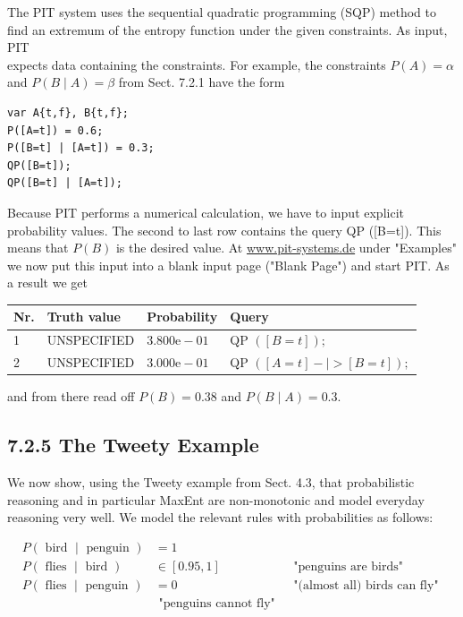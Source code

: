 \documentclass[10pt]{book}
\begin{document}
\begin{center}
\begin{enumerate}
The PIT system uses the sequential quadratic programming (SQP) method to find an extremum of the entropy function under the given constraints. As input, PIT\\
expects data containing the constraints. For example, the constraints $P(A)=\alpha$ and $P(B \mid A)=\beta$ from Sect. 7.2.1 have the form


\begin{verbatim}
var A{t,f}, B{t,f};
P([A=t]) = 0.6;
P([B=t] | [A=t]) = 0.3;
QP([B=t]);
QP([B=t] | [A=t]);
\end{verbatim}

Because PIT performs a numerical calculation, we have to input explicit probability values. The second to last row contains the query QP ([B=t]). This means that $P(B)$ is the desired value. At \href{http://www.pit-systems.de}{www.pit-systems.de} under "Examples" we now put this input into a blank input page ("Blank Page") and start PIT. As a result we get

\begin{center}
\begin{tabular}{llll}
\hline
Nr. & Truth value & Probability & Query \\
\hline
1 & UNSPECIFIED & $3.800 \mathrm{e}-01$ & QP $([B=t]) ;$ \\
\hline
2 & UNSPECIFIED & $3.000 \mathrm{e}-01$ & QP $([A=t]-\mid>[B=t]) ;$ \\
\hline
\end{tabular}
\end{center}

and from there read off $P(B)=0.38$ and $P(B \mid A)=0.3$.

\subsection*{7.2.5 The Tweety Example}
We now show, using the Tweety example from Sect. 4.3, that probabilistic reasoning and in particular MaxEnt are non-monotonic and model everyday reasoning very well. We model the relevant rules with probabilities as follows:

$$
\begin{array}{lll}
P(\text { bird } \mid \text { penguin }) & =1 & \\
P(\text { flies } \mid \text { bird }) & \in[0.95,1] & \text { "penguins are birds" } \\
P(\text { flies } \mid \text { penguin }) & =0 & \text { "(almost all) birds can fly" } \\
& \text { "penguins cannot fly" }
\end{array}
$$


\end{enumerate}
\end{center}
\end{document}
